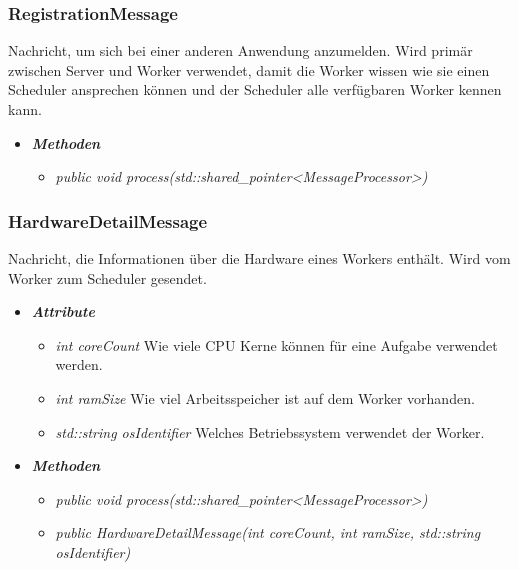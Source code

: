 \documentclass[a4paper,12pt]{article}
\begin{document}
\subsubsection{RegistrationMessage}

Nachricht, um sich bei einer anderen Anwendung anzumelden. Wird primär zwischen Server und Worker verwendet, damit die Worker wissen wie sie einen Scheduler ansprechen können und der Scheduler alle verfügbaren Worker kennen kann.

	\begin{itemize}[label={}]

	\item\textit{\textbf{Methoden}}
		\begin{itemize}[label={\textbullet}]
			\item\textit{public void process(std::shared\_pointer<MessageProcessor>)}

		\end{itemize}

\end{itemize}


\subsubsection{HardwareDetailMessage}

Nachricht, die Informationen über die Hardware eines Workers enthält. Wird vom Worker zum Scheduler gesendet.

	\begin{itemize}[label={}]

	\item\textit{\textbf{Attribute}}
		\begin{itemize}[label={\textbullet}]
			\item\textit{int coreCount} Wie viele CPU Kerne können für eine Aufgabe verwendet werden.
			\item\textit{int ramSize} Wie viel Arbeitsspeicher ist auf dem Worker vorhanden.
			\item\textit{std::string osIdentifier} Welches Betriebssystem verwendet der Worker.
			
		\end{itemize}

	\item\textit{\textbf{Methoden}}
		\begin{itemize}[label={\textbullet}]
			\item\textit{public void process(std::shared\_pointer<MessageProcessor>)}
			\item\textit{public HardwareDetailMessage(int coreCount, int ramSize, std::string osIdentifier)}

		\end{itemize}

\end{itemize}
\end{document}
